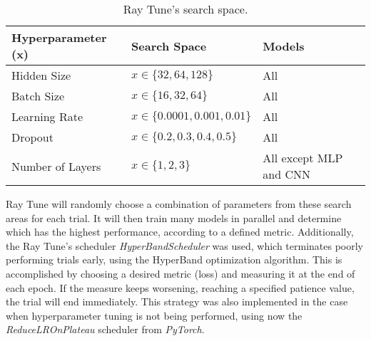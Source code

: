 \begin{table}[ht]
	\caption{Ray Tune's search space.}
	\label{tab:search_space}
    \centering
    \begin{tabular}{lll}
    	\toprule
    	\textbf{Hyperparameter (x)} & \textbf{Search Space} & \textbf{Models} \\\midrule
    	
    	Hidden Size & $x \in \{32, 64, 128\}$ & All\\\midrule
        Batch Size & $x \in \{16, 32, 64\}$ & All\\\midrule
        Learning Rate & $x \in \{0.0001, 0.001, 0.01\}$ & All\\\midrule
        Dropout & $x \in \{0.2, 0.3, 0.4, 0.5\}$ & All\\\midrule
        Number of Layers & $x \in \{1, 2, 3\}$ & All except MLP and CNN\\
        
    	\bottomrule
    \end{tabular}
\end{table}

Ray Tune will randomly choose a combination of parameters from these search areas for each trial. It will then train many models in parallel and determine which has the highest performance, according to a defined metric. Additionally, the Ray Tune's scheduler \textit{HyperBandScheduler} was used, which terminates poorly performing trials early, using the HyperBand optimization algorithm. This is accomplished by choosing a desired metric (loss) and measuring it at the end of each epoch. If the measure keeps worsening, reaching a specified patience value, the trial will end immediately. This strategy was also implemented in the case when hyperparameter tuning is not being performed, using now the \textit{ReduceLROnPlateau} scheduler from \textit{PyTorch}. 